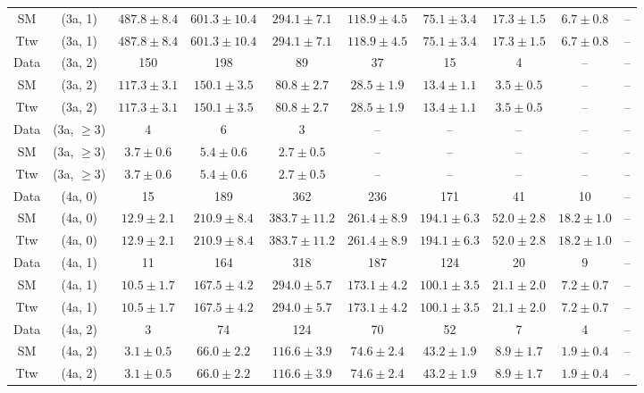 \begin{table}[h!]
{\begin{tabular}{cccccccccc}
	SM & (3a, 1) & $487.8\pm 8.4$ & $601.3\pm 10.4$ & $294.1\pm 7.1$ & $118.9\pm 4.5$ & $75.1\pm 3.4$ & $17.3\pm 1.5$ & $6.7\pm 0.8$ & -- \\[0.5ex] 
	Ttw & (3a, 1) & $487.8\pm 8.4$ & $601.3\pm 10.4$ & $294.1\pm 7.1$ & $118.9\pm 4.5$ & $75.1\pm 3.4$ & $17.3\pm 1.5$ & $6.7\pm 0.8$ & -- \\[0.5ex] 
	Data & (3a, 2) & 150 & 198 & 89 & 37 & 15 & 4 & -- & -- \\[0.5ex] 
	SM & (3a, 2) & $117.3\pm 3.1$ & $150.1\pm 3.5$ & $80.8\pm 2.7$ & $28.5\pm 1.9$ & $13.4\pm 1.1$ & $3.5\pm 0.5$ & -- & -- \\[0.5ex] 
	Ttw & (3a, 2) & $117.3\pm 3.1$ & $150.1\pm 3.5$ & $80.8\pm 2.7$ & $28.5\pm 1.9$ & $13.4\pm 1.1$ & $3.5\pm 0.5$ & -- & -- \\[0.5ex] 
	Data & (3a, $\ge3$) & 4 & 6 & 3 & -- & -- & -- & -- & -- \\[0.5ex] 
	SM & (3a, $\ge3$) & $3.7\pm 0.6$ & $5.4\pm 0.6$ & $2.7\pm 0.5$ & -- & -- & -- & -- & -- \\[0.5ex] 
	Ttw & (3a, $\ge3$) & $3.7\pm 0.6$ & $5.4\pm 0.6$ & $2.7\pm 0.5$ & -- & -- & -- & -- & -- \\[0.5ex] 
	Data & (4a, 0) & 15 & 189 & 362 & 236 & 171 & 41 & 10 & -- \\[0.5ex] 
	SM & (4a, 0) & $12.9\pm 2.1$ & $210.9\pm 8.4$ & $383.7\pm 11.2$ & $261.4\pm 8.9$ & $194.1\pm 6.3$ & $52.0\pm 2.8$ & $18.2\pm 1.0$ & -- \\[0.5ex] 
	Ttw & (4a, 0) & $12.9\pm 2.1$ & $210.9\pm 8.4$ & $383.7\pm 11.2$ & $261.4\pm 8.9$ & $194.1\pm 6.3$ & $52.0\pm 2.8$ & $18.2\pm 1.0$ & -- \\[0.5ex] 
	Data & (4a, 1) & 11 & 164 & 318 & 187 & 124 & 20 & 9 & -- \\[0.5ex] 
	SM & (4a, 1) & $10.5\pm 1.7$ & $167.5\pm 4.2$ & $294.0\pm 5.7$ & $173.1\pm 4.2$ & $100.1\pm 3.5$ & $21.1\pm 2.0$ & $7.2\pm 0.7$ & -- \\[0.5ex] 
	Ttw & (4a, 1) & $10.5\pm 1.7$ & $167.5\pm 4.2$ & $294.0\pm 5.7$ & $173.1\pm 4.2$ & $100.1\pm 3.5$ & $21.1\pm 2.0$ & $7.2\pm 0.7$ & -- \\[0.5ex] 
	Data & (4a, 2) & 3 & 74 & 124 & 70 & 52 & 7 & 4 & -- \\[0.5ex] 
	SM & (4a, 2) & $3.1\pm 0.5$ & $66.0\pm 2.2$ & $116.6\pm 3.9$ & $74.6\pm 2.4$ & $43.2\pm 1.9$ & $8.9\pm 1.7$ & $1.9\pm 0.4$ & -- \\[0.5ex] 
	Ttw & (4a, 2) & $3.1\pm 0.5$ & $66.0\pm 2.2$ & $116.6\pm 3.9$ & $74.6\pm 2.4$ & $43.2\pm 1.9$ & $8.9\pm 1.7$ & $1.9\pm 0.4$ & -- \\[0.5ex] 

\end{tabular}}
\end{table}
